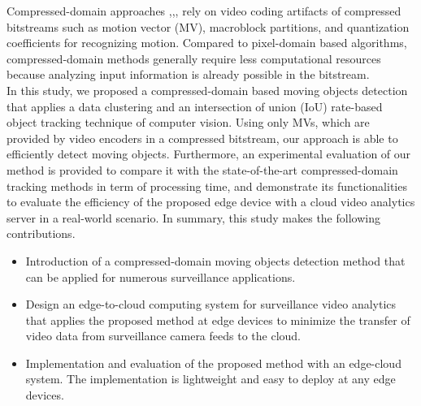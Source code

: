 Compressed-domain approaches \cite{favalli2000object},\cite{yoneyama1999moving},\cite{dong2006object},\cite{achanta2002compressed} rely on video coding artifacts of compressed bitstreams such as motion vector (MV), macroblock partitions, and quantization coefficients for recognizing motion. Compared to pixel-domain based algorithms, compressed-domain methods generally require less computational resources because analyzing input information is already possible in the bitstream.\\ In this study, we proposed a compressed-domain based moving objects detection that applies a data clustering and an intersection of union (IoU) rate-based object tracking technique of computer vision. Using only MVs, which are provided by video encoders in a compressed bitstream, our approach is able to efficiently detect moving objects. Furthermore, an experimental evaluation of our method is provided to compare it with the state-of-the-art compressed-domain tracking methods in term of processing time, and demonstrate its functionalities to evaluate the efficiency of the proposed edge device with a cloud video analytics server in a real-world scenario. In summary, this study makes the following contributions.
\begin{itemize}
\item Introduction of a compressed-domain moving objects detection method that can be applied for numerous surveillance applications.
\item Design an edge-to-cloud computing system for surveillance video analytics that applies the proposed method at edge devices to minimize the transfer of video data from surveillance camera feeds to the cloud.
\item Implementation and evaluation of the proposed method with an edge-cloud system. The implementation is lightweight and easy to deploy at any edge devices.
\end{itemize}
%
%